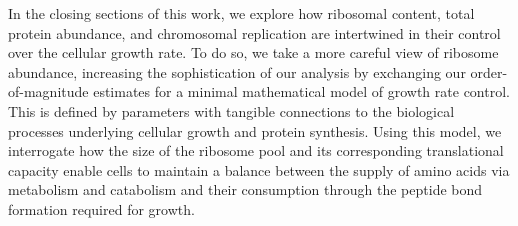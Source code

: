 In the closing sections of this work, we explore how ribosomal content, total
protein abundance, and chromosomal replication are intertwined in their control
over the cellular growth rate. To do so, we take a more careful view of ribosome
abundance, increasing the sophistication of our analysis by exchanging our order-of-magnitude estimates for a minimal
mathematical model of growth rate control. This is defined by parameters with
tangible connections to the biological processes underlying cellular growth and
protein synthesis. Using this model, we interrogate how the size of the ribosome
pool and its corresponding translational capacity enable cells to maintain a
balance  between the supply of amino acids via metabolism and catabolism and their
consumption through the peptide bond formation required for growth.

\begin{figure}
\end{figure}
